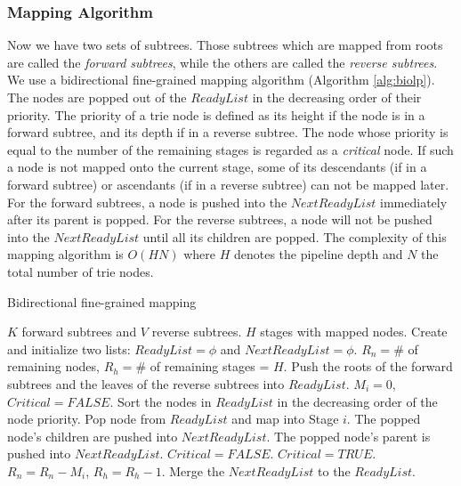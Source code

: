 \documentclass{sigcomm-alternate}
\begin{document}
\subsubsection{Mapping Algorithm}

Now we have two sets of subtrees. Those subtrees which are mapped from roots are called the \textit{forward subtrees}, while the others are called the \textit{reverse subtrees}. We use a bidirectional fine-grained mapping algorithm (Algorithm \ref{alg:biolp}). The nodes are popped out of the $ReadyList$ in the decreasing order of their priority. The priority of a trie node is defined as its height if the node is in a forward subtree, and its depth if in a reverse subtree. The node whose priority is equal to the number of the remaining stages is regarded as a \textit{critical} node. If such a node is not mapped onto the current stage, some of its descendants (if in a forward subtree) or ascendants (if in a reverse subtree) can not be mapped later. For the forward subtrees, a node is pushed into the $NextReadyList$ immediately after its parent is popped. For the reverse subtrees, a node will not be pushed into the $NextReadyList$ until all its children are popped. The complexity of this mapping algorithm is $O(HN)$ where $H$ denotes the pipeline depth and $N$ the total number of trie nodes.


\begin{algorithm}[htb]
\caption{Bidirectional fine-grained mapping}
\label{alg:biolp}
\begin{algorithmic}[1]
\REQUIRE $K$ forward subtrees and $V$ reverse subtrees.
\ENSURE $H$ stages with mapped nodes.
\STATE Create and initialize two lists: $ReadyList = \phi$ and $NextReadyList = \phi$.
\STATE $R_n = \#$ of remaining nodes, $R_h = \#$ of remaining stages = $H$.
\STATE Push the roots of the forward subtrees and the leaves of the reverse subtrees into $ReadyList$.
\STATE $M_i = 0$, $Critical = FALSE$.
\STATE Sort the nodes in $ReadyList$ in the decreasing order of the node priority.
\STATE Pop node from $ReadyList$ and map into Stage $i$. 
\STATE The popped node's children are pushed into $NextReadyList$.
\STATE The popped node's parent is pushed into $NextReadyList$.
\ENDIF
\STATE $Critical = FALSE$.
\STATE $Critical = TRUE$.
\ENDIF
\ENDWHILE
\STATE $R_n = R_n - M_i$, $R_h = R_h - 1$.
\STATE Merge the $NextReadyList$ to the $ReadyList$.
\ENDFOR
\end{algorithmic}
\end{algorithm}
\end{document}
